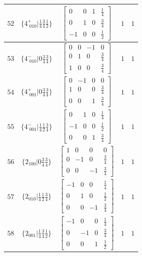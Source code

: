 \documentclass[fleqn,8pt]{jsarticle}
\begin{document}
\begin{longtable}{ccccc}
$ 52 $ & $ \{4^{+}_{\,\,010}|\frac{1}{4} \frac{3}{4} \frac{1}{2}\} $ & $ \begin{bmatrix} 0 & 0 & 1 & \frac{1}{4} \\ 0 & 1 & 0 & \frac{3}{4} \\ -1 & 0 & 0 & \frac{1}{2} \end{bmatrix} $ & $ 1 $ & $ 1 $ \\ \hline
$ 53 $ & $ \{4^{-}_{\,\,010}|0 \frac{3}{4} \frac{3}{4}\} $ & $ \begin{bmatrix} 0 & 0 & -1 & 0 \\ 0 & 1 & 0 & \frac{3}{4} \\ 1 & 0 & 0 & \frac{3}{4} \end{bmatrix} $ & $ 1 $ & $ 1 $ \\ \hline
$ 54 $ & $ \{4^{+}_{\,\,001}|0 \frac{3}{4} \frac{3}{4}\} $ & $ \begin{bmatrix} 0 & -1 & 0 & 0 \\ 1 & 0 & 0 & \frac{3}{4} \\ 0 & 0 & 1 & \frac{3}{4} \end{bmatrix} $ & $ 1 $ & $ 1 $ \\ \hline
$ 55 $ & $ \{4^{-}_{\,\,001}|\frac{1}{4} \frac{1}{2} \frac{3}{4}\} $ & $ \begin{bmatrix} 0 & 1 & 0 & \frac{1}{4} \\ -1 & 0 & 0 & \frac{1}{2} \\ 0 & 0 & 1 & \frac{3}{4} \end{bmatrix} $ & $ 1 $ & $ 1 $ \\ \hline
$ 56 $ & $ \{2{}_{100}|0 \frac{3}{4} \frac{3}{4}\} $ & $ \begin{bmatrix} 1 & 0 & 0 & 0 \\ 0 & -1 & 0 & \frac{3}{4} \\ 0 & 0 & -1 & \frac{3}{4} \end{bmatrix} $ & $ 1 $ & $ 1 $ \\ \hline
$ 57 $ & $ \{2{}_{010}|\frac{1}{4} \frac{1}{2} \frac{3}{4}\} $ & $ \begin{bmatrix} -1 & 0 & 0 & \frac{1}{4} \\ 0 & 1 & 0 & \frac{1}{2} \\ 0 & 0 & -1 & \frac{3}{4} \end{bmatrix} $ & $ 1 $ & $ 1 $ \\ \hline
$ 58 $ & $ \{2{}_{001}|\frac{1}{4} \frac{3}{4} \frac{1}{2}\} $ & $ \begin{bmatrix} -1 & 0 & 0 & \frac{1}{4} \\ 0 & -1 & 0 & \frac{3}{4} \\ 0 & 0 & 1 & \frac{1}{2} \end{bmatrix} $ & $ 1 $ & $ 1 $ \\ \hline

\end{longtable}
\end{document}
